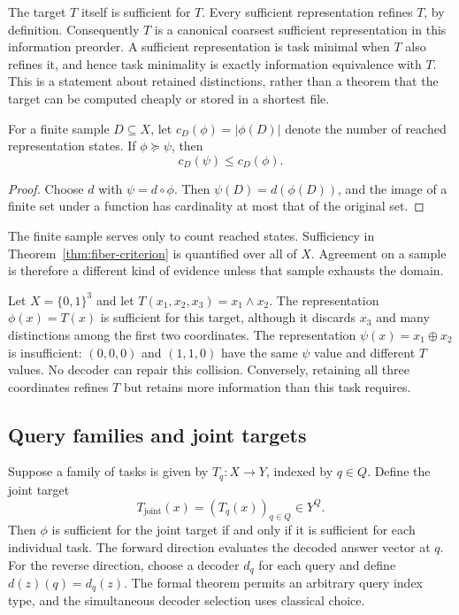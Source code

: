 The target $T$ itself is sufficient for $T$. Every sufficient representation refines $T$, by definition. Consequently $T$ is a canonical coarsest sufficient representation in this information preorder. A sufficient representation is task minimal when $T$ also refines it, and hence task minimality is exactly information equivalence with $T$. This is a statement about retained distinctions, rather than a theorem that the target can be computed cheaply or stored in a shortest file.

\begin{proposition}
For a finite sample $D\subseteq X$, let $c_D(\phi)=|\phi(D)|$ denote the number of reached representation states. If $\phi\succeq\psi$, then
\[
 c_D(\psi)\le c_D(\phi).
\]
\end{proposition}
\begin{proof}
Choose $d$ with $\psi=d\circ\phi$. Then $\psi(D)=d(\phi(D))$, and the image of a finite set under a function has cardinality at most that of the original set.
\end{proof}

The finite sample serves only to count reached states. Sufficiency in Theorem~\ref{thm:fiber-criterion} is quantified over all of $X$. Agreement on a sample is therefore a different kind of evidence unless that sample exhausts the domain.

\begin{example}
Let $X=\{0,1\}^3$ and let $T(x_1,x_2,x_3)=x_1\wedge x_2$. The representation $\phi(x)=T(x)$ is sufficient for this target, although it discards $x_3$ and many distinctions among the first two coordinates. The representation $\psi(x)=x_1\oplus x_2$ is insufficient: $(0,0,0)$ and $(1,1,0)$ have the same $\psi$ value and different $T$ values. No decoder can repair this collision. Conversely, retaining all three coordinates refines $T$ but retains more information than this task requires.
\end{example}

\subsection{Query families and joint targets}

Suppose a family of tasks is given by $T_q:X\to Y$, indexed by $q\in Q$. Define the joint target
\[
 T_{\mathrm{joint}}(x)=(T_q(x))_{q\in Q}\in Y^Q.
\]
Then $\phi$ is sufficient for the joint target if and only if it is sufficient for each individual task. The forward direction evaluates the decoded answer vector at $q$. For the reverse direction, choose a decoder $d_q$ for each query and define $d(z)(q)=d_q(z)$. The formal theorem permits an arbitrary query index type, and the simultaneous decoder selection uses classical choice.

